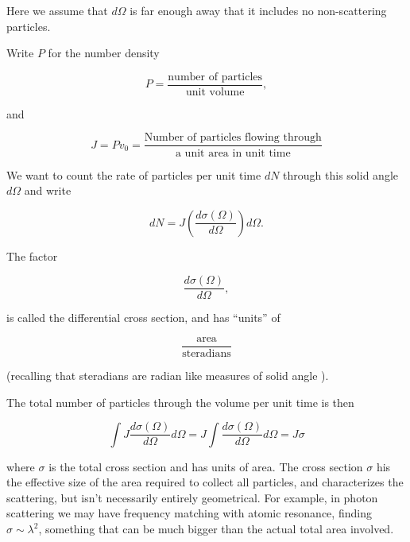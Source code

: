Here we assume that $d\Omega$ is far enough away that it includes no non-scattering particles.

Write $P$ for the number density

\begin{equation}\label{eqn:qmTwoL23:680}
P = \frac{\text{number of particles}}{\text{unit volume}},
\end{equation}

and

\begin{equation}\label{eqn:qmTwoL23:700}
J = P v_0 =
\frac{
\text{Number of particles flowing through}
}{
\text{a unit area in unit time}
}
\end{equation}

We want to count the rate of particles per unit time $dN$ through this solid angle $d\Omega$ and write

\begin{equation}\label{eqn:qmTwoL23:720}
dN = J \left( \frac{d \sigma(\Omega)}{d\Omega} \right) d\Omega.
\end{equation}

The factor

\begin{equation}\label{eqn:qmTwoL23:740}
\frac{d \sigma(\Omega)}{d\Omega},
\end{equation}

is called the differential cross section, and has ``units'' of

\begin{equation}\label{eqn:qmTwoL23:760}
\frac{\text{area}}{\text{steradians}}
\end{equation}

(recalling that steradians are radian like measures of solid angle \cite{wiki:steradian}).

The total number of particles through the volume per unit time is then

\begin{equation}\label{eqn:qmTwoL23:780}
\int J \frac{d \sigma(\Omega)}{d\Omega} d\Omega
= J \int \frac{d \sigma(\Omega)}{d\Omega} d\Omega
= J \sigma
\end{equation}

where $\sigma$ is the total cross section and has units of area.  The cross section $\sigma$ his the effective size of the area required to collect all particles, and characterizes the scattering, but isn't necessarily entirely geometrical.  For example, in photon scattering we may have frequency matching with atomic resonance, finding $\sigma \sim \lambda^2$, something that can be much bigger than the actual total area involved.


